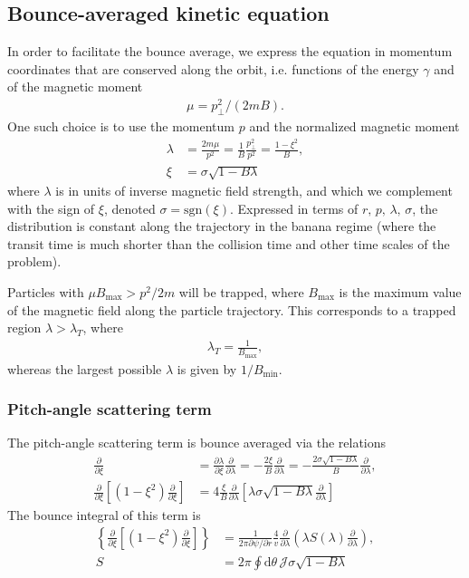 \documentclass[11pt,a4paper]{article}
\newcommand{\rd}{\ensuremath{\mathrm{d}}}
\newcommand{\sub}[1]{\ensuremath{_{\text{#1}}}}
\begin{document}
\subsection{Bounce-averaged kinetic equation}
In order to facilitate the bounce average, we express the equation in momentum coordinates that are conserved along the orbit, i.e. functions of the energy $\gamma$ and of the magnetic moment 
\begin{align}
\mu = p_\perp^2/(2mB).
\end{align}
One such choice is to use the momentum $p$ and the normalized magnetic moment
\begin{align}
\lambda &= \frac{2m\mu}{p^2} = \frac{1}{B}\frac{p_\perp^2}{p^2}= \frac{1-\xi^2}{B}, \nonumber \\
\xi &= \sigma \sqrt{1-B\lambda}
\end{align}
where $\lambda$ is in units of inverse magnetic field strength, and which we complement with the sign of $\xi$, denoted $\sigma = \text{sgn}(\xi)$. Expressed in terms of $r,\,p,\,\lambda,\,\sigma$, the distribution is constant along the trajectory in the banana regime (where the transit time is much shorter than the collision time and other time scales of the problem).

Particles with $\mu B\sub{max} > p^2/2m$ will be trapped, where $B\sub{max}$ is the maximum value of the magnetic field along the particle trajectory. This corresponds to a trapped region $\lambda > \lambda_{T}$, where
\begin{align}
\lambda_T = \frac{1}{B\sub{max}},
\end{align}
whereas the largest possible $\lambda$ is given by $1/B\sub{min}$.

\subsubsection*{Pitch-angle scattering term}
The pitch-angle scattering term is bounce averaged via the relations
\begin{align}
\frac{\partial}{\partial \xi} &= \frac{\partial \lambda}{\partial \xi} \frac{\partial}{\partial \lambda} = -\frac{2\xi}{B}\frac{\partial}{\partial \lambda} = -\frac{2\sigma \sqrt{1-B\lambda}}{B}\frac{\partial}{\partial \lambda}, \nonumber \\
\frac{\partial}{\partial \xi}\left[(1-\xi^2)\frac{\partial}{\partial \xi} \right] &= 4\frac{\xi}{B} \frac{\partial}{\partial \lambda}  \left[\lambda \sigma \sqrt{1-B\lambda}\frac{\partial}{\partial \lambda}\right]
\end{align}
The bounce integral of this term is
\begin{align}
\left\{ \frac{\partial}{\partial \xi}\left[(1-\xi^2)\frac{\partial}{\partial \xi} \right]\right\} &= \frac{1}{2\pi\partial \psi/\partial r} \frac{4}{ v}\frac{\partial}{\partial \lambda}\left(\lambda S(\lambda)\frac{\partial}{\partial \lambda}\right), \nonumber \\
S &= 2\pi \oint \rd \theta \,\mathcal{J}\sigma\sqrt{1-B\lambda}
\end{align}
\end{document}

